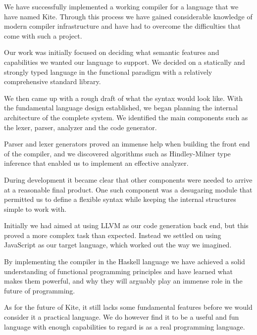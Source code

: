 
We have successfully implemented a working compiler for a language that we have named Kite. Through this process we have gained considerable knowledge of modern compiler infrastructure and have had to overcome the difficulties that come with such a project.

Our work was initially focused on deciding what semantic features and capabilities we wanted our language to support. We decided on a statically and strongly typed language in the functional paradigm with a relatively comprehensive standard library.

We then came up with a rough draft of what the syntax would look like. With the fundamental language design established, we began planning the internal architecture of the complete system. We identified the main components such as the lexer, parser, analyzer and the code generator.

Parser and lexer generators proved an immense help when building the front end of the compiler, and we discovered algorithms such as Hindley-Milner type inference that enabled us to implement an effective analyzer.

During development it became clear that other components were needed to arrive at a reasonable final product. One such component was a desugaring module that permitted us to define a flexible syntax while keeping the internal structures simple to work with.

Initially we had aimed at using LLVM as our code generation back end, but this proved a more complex task than expected. Instead we settled on using JavaScript as our target language, which worked out the way we imagined.

By implementing the compiler in the Haskell language we have achieved a solid understanding of functional programming principles and have learned what makes them powerful, and why they will arguably play an immense role in the future of programming.

As for the future of Kite, it still lacks some fundamental features before we would consider it a practical language. We do however find it to be a useful and fun language with enough capabilities to regard is as a real programming language.